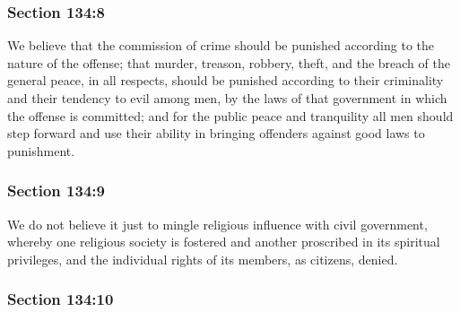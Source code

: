 	\subsubsection{Section 134:8} %
		\label{DC134-8}

		We believe that the commission of crime should be punished according to the nature of the offense; that murder, treason, robbery, theft, and the breach of the general peace, in all respects, should be punished according to their criminality and their tendency to evil among men, by the laws of that government in which the offense is committed; and for the public peace and tranquility all men should step forward and use their ability in bringing offenders against good laws to punishment.


	\subsubsection{Section 134:9} %
		\label{DC134-9}

		We do not believe it just to mingle religious influence with civil government, whereby one religious society is fostered and another proscribed in its spiritual privileges, and the individual rights of its members, as citizens, denied.


	\subsubsection{Section 134:10} %
		\label{DC134-10}

